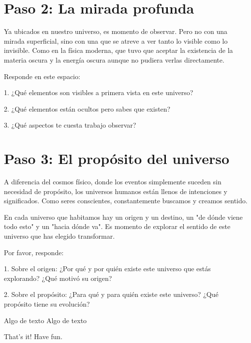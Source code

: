 \documentclass[statementpaper,oneside,article,10pt]{memoir}
\begin{document}
\section{Paso 2: La mirada profunda}

Ya ubicados en nuestro universo, es momento de observar. Pero no con una mirada superficial, sino con una que se atreve a ver tanto lo visible como lo invisible. Como en la física moderna, que tuvo que aceptar la existencia de la materia oscura y la energía oscura aunque no pudiera verlas directamente.

Responde en este espacio:

1. ¿Qué elementos son visibles a primera vista en este universo?
\vspace{4cm}

2. ¿Qué elementos están ocultos pero sabes que existen?
\vspace{4cm}

3. ¿Qué aspectos te cuesta trabajo observar?
\vspace{4cm}

\newpage

\section{Paso 3: El propósito del universo}

A diferencia del cosmos físico, donde los eventos simplemente suceden sin necesidad de propósito, los universos humanos están llenos de intenciones y significados. Como seres conscientes, constantemente buscamos y creamos sentido.

En cada universo que habitamos hay un origen y un destino, un "de dónde viene todo esto" y un "hacia dónde va". Es momento de explorar el sentido de este universo que has elegido transformar.

Por favor, responde:

1. Sobre el origen:
¿Por qué y por quién existe este universo que estás explorando?  ¿Qué motivó su origen?
\vspace{5cm}

2. Sobre el propósito:
¿Para qué y para quién existe este universo? ¿Qué propósito tiene su evolución?
\vspace{5cm}


\newpage
Algo de texto
\newpage
Algo de texto
\newpage





\newpage

\Large That's it! Have fun.
\end{document}
